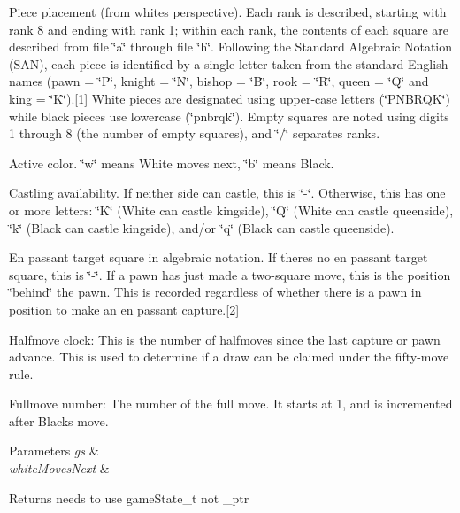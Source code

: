 \begin{DoxyEnumerate}
\item Piece placement (from white\textquotesingle{}s perspective). Each rank is described, starting with rank 8 and ending with rank 1; within each rank, the contents of each square are described from file \char`\"{}a\char`\"{} through file \char`\"{}h\char`\"{}. Following the Standard Algebraic Notation (S\+AN), each piece is identified by a single letter taken from the standard English names (pawn = \char`\"{}\+P\char`\"{}, knight = \char`\"{}\+N\char`\"{}, bishop = \char`\"{}\+B\char`\"{}, rook = \char`\"{}\+R\char`\"{}, queen = \char`\"{}\+Q\char`\"{} and king = \char`\"{}\+K\char`\"{}).\mbox{[}1\mbox{]} White pieces are designated using upper-\/case letters (\char`\"{}\+P\+N\+B\+R\+Q\+K\char`\"{}) while black pieces use lowercase (\char`\"{}pnbrqk\char`\"{}). Empty squares are noted using digits 1 through 8 (the number of empty squares), and \char`\"{}/\char`\"{} separates ranks.
\item Active color. \char`\"{}w\char`\"{} means White moves next, \char`\"{}b\char`\"{} means Black.
\item Castling availability. If neither side can castle, this is \char`\"{}-\/\char`\"{}. Otherwise, this has one or more letters\+: \char`\"{}\+K\char`\"{} (White can castle kingside), \char`\"{}\+Q\char`\"{} (White can castle queenside), \char`\"{}k\char`\"{} (Black can castle kingside), and/or \char`\"{}q\char`\"{} (Black can castle queenside).
\item En passant target square in algebraic notation. If there\textquotesingle{}s no en passant target square, this is \char`\"{}-\/\char`\"{}. If a pawn has just made a two-\/square move, this is the position \char`\"{}behind\char`\"{} the pawn. This is recorded regardless of whether there is a pawn in position to make an en passant capture.\mbox{[}2\mbox{]}
\item Halfmove clock\+: This is the number of halfmoves since the last capture or pawn advance. This is used to determine if a draw can be claimed under the fifty-\/move rule.
\item Fullmove number\+: The number of the full move. It starts at 1, and is incremented after Black\textquotesingle{}s move.
\end{DoxyEnumerate}


\begin{DoxyParams}{Parameters}
{\em gs} & \\
\hline
{\em white\+Moves\+Next} & \\
\hline
\end{DoxyParams}
\begin{DoxyReturn}{Returns}
needs to use game\+State\+\_\+t not \+\_\+ptr 
\end{DoxyReturn}
\mbox{\label{namespaceutils_1_1gameState_a049c7f47b9e2cdee5cb549dbc7e02ea7}} 
